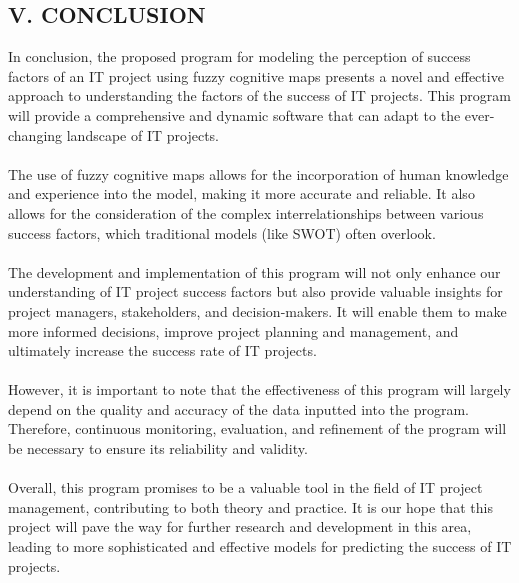 \documentclass{article}
\begin{document}
\begin{minipage}{0.49\textwidth}
\begin{center}
            \chapter{V. CONCLUSION}
        \end{center}
        In conclusion, the proposed program for modeling the perception of success factors of an IT project using fuzzy cognitive maps presents a novel and effective approach to understanding the factors of the success of IT projects. This program will provide a comprehensive and dynamic software that can adapt to the ever-changing landscape of IT projects.\\
        ~\\
        The use of fuzzy cognitive maps allows for the incorporation of human knowledge and experience into the model, making it more accurate and reliable. It also allows for the consideration of the complex interrelationships between various success factors, which traditional models (like SWOT) often overlook.\\
        ~\\
        The development and implementation of this program will not only enhance our understanding of IT project success factors but also provide valuable insights for project managers, stakeholders, and decision-makers. It will enable them to make more informed decisions, improve project planning and management, and ultimately increase the success rate of IT projects.\\
        ~\\
        However, it is important to note that the effectiveness of this program will largely depend on the quality and accuracy of the data inputted into the program. Therefore, continuous monitoring, evaluation, and refinement of the program will be necessary to ensure its reliability and validity.\\
        ~\\
        Overall, this program promises to be a valuable tool in the field of IT project management, contributing to both theory and practice. It is our hope that this project will pave the way for further research and development in this area, leading to more sophisticated and effective models for predicting the success of IT projects.\\
    ~\\
    ~\\
    ~\\
    ~\\
    ~\\

\end{minipage}
\end{document}

